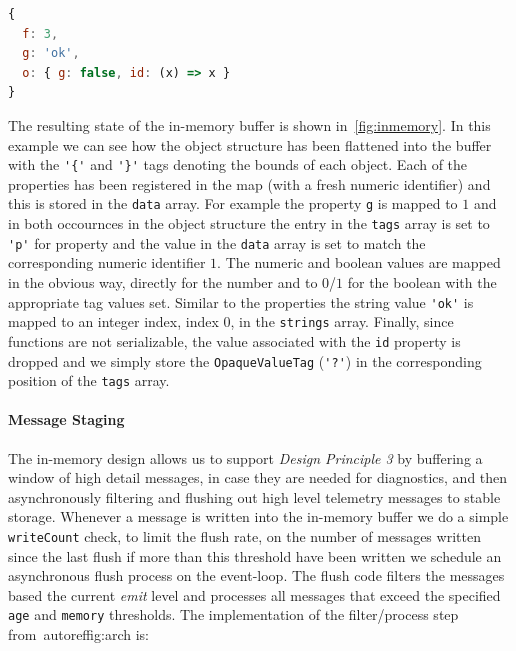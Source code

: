 \begin{lstlisting}[language=JavaScript,basicstyle=\scriptsize,numbers=none]
{
  f: 3,
  g: 'ok',
  o: { g: false, id: (x) => x }
}
\end{lstlisting}

The resulting state of the in-memory buffer is shown in~\autoref{fig:inmemory}. 
In this example we can see how the object structure has been flattened into 
the buffer with the \lstinline!'{'! and \lstinline!'}'! tags denoting the bounds 
of each object. Each of the properties has been registered in the map (with a fresh 
numeric identifier) and this is stored in the \texttt{data} array. For example the 
property \lstinline!g! is mapped to $1$ and in both occournces in the object 
structure the entry in the \texttt{tags} array is set to \lstinline!'p'! for 
property and the value in the \texttt{data} array is set to match the corresponding 
numeric identifier $1$. The numeric and boolean values are mapped in the obvious 
way, directly for the number and to $0$/$1$ for the boolean with the appropriate 
tag values set. Similar to the properties the string value \lstinline!'ok'! is 
mapped to an integer index, index $0$, in the \texttt{strings} array. Finally, 
since functions are not serializable, the value associated with the \lstinline!id! 
property is dropped and we simply store the \texttt{OpaqueValueTag} (\lstinline!'?'!) 
in the corresponding position of the \texttt{tags} array.

\paragraph{Message Staging}
\noindent
The in-memory design allows us to support \emph{Design Principle 3} by buffering a 
window of high detail messages, in case they are needed for diagnostics, and then 
asynchronously filtering and flushing out high level telemetry messages to stable 
storage. Whenever a message is written into the in-memory buffer we do a simple 
\texttt{writeCount} check, to limit the flush rate, on the number of messages written 
since the last flush if more than this threshold have been written we schedule an 
asynchronous flush process on the event-loop. The flush code filters the messages 
based the current \emph{emit} level and processes all messages that exceed the 
specified \texttt{age} and \texttt{memory} thresholds. The implementation of the 
filter/process step from~autoref{fig:arch} is:



